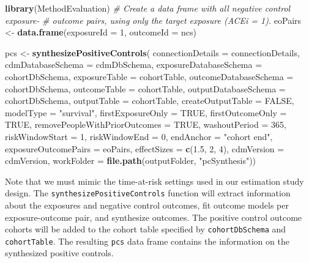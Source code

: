 \documentclass[11pt]{book}
\newenvironment{Shaded}{\begin{snugshade}}{\end{snugshade}}
\newcommand{\KeywordTok}[1]{\textcolor[rgb]{0.13,0.29,0.53}{\textbf{#1}}}
\newcommand{\DataTypeTok}[1]{\textcolor[rgb]{0.13,0.29,0.53}{#1}}
\newcommand{\DecValTok}[1]{\textcolor[rgb]{0.00,0.00,0.81}{#1}}
\newcommand{\FloatTok}[1]{\textcolor[rgb]{0.00,0.00,0.81}{#1}}
\newcommand{\StringTok}[1]{\textcolor[rgb]{0.31,0.60,0.02}{#1}}
\newcommand{\CommentTok}[1]{\textcolor[rgb]{0.56,0.35,0.01}{\textit{#1}}}
\newcommand{\OtherTok}[1]{\textcolor[rgb]{0.56,0.35,0.01}{#1}}
\newcommand{\NormalTok}[1]{#1}
\theoremstyle{definition}
\theoremstyle{definition}
\theoremstyle{definition}
\theoremstyle{remark}
\begin{document}
\begin{Shaded}
\begin{Highlighting}[]
\KeywordTok{library}\NormalTok{(MethodEvaluation)}
\CommentTok{# Create a data frame with all negative control exposure-}
\CommentTok{# outcome pairs, using only the target exposure (ACEi = 1).}
\NormalTok{eoPairs <-}\StringTok{ }\KeywordTok{data.frame}\NormalTok{(}\DataTypeTok{exposureId =} \DecValTok{1}\NormalTok{,}
                      \DataTypeTok{outcomeId =}\NormalTok{ ncs)}

\NormalTok{pcs <-}\StringTok{ }\KeywordTok{synthesizePositiveControls}\NormalTok{(}
  \DataTypeTok{connectionDetails =}\NormalTok{ connectionDetails,}
  \DataTypeTok{cdmDatabaseSchema =}\NormalTok{ cdmDbSchema,}
  \DataTypeTok{exposureDatabaseSchema =}\NormalTok{ cohortDbSchema,}
  \DataTypeTok{exposureTable =}\NormalTok{ cohortTable,}
  \DataTypeTok{outcomeDatabaseSchema =}\NormalTok{ cohortDbSchema,}
  \DataTypeTok{outcomeTable =}\NormalTok{ cohortTable,}
  \DataTypeTok{outputDatabaseSchema =}\NormalTok{ cohortDbSchema,}
  \DataTypeTok{outputTable =}\NormalTok{ cohortTable,}
  \DataTypeTok{createOutputTable =} \OtherTok{FALSE}\NormalTok{,}
  \DataTypeTok{modelType =} \StringTok{"survival"}\NormalTok{,}
  \DataTypeTok{firstExposureOnly =} \OtherTok{TRUE}\NormalTok{,}
  \DataTypeTok{firstOutcomeOnly =} \OtherTok{TRUE}\NormalTok{,}
  \DataTypeTok{removePeopleWithPriorOutcomes =} \OtherTok{TRUE}\NormalTok{,}
  \DataTypeTok{washoutPeriod =} \DecValTok{365}\NormalTok{,}
  \DataTypeTok{riskWindowStart =} \DecValTok{1}\NormalTok{,}
  \DataTypeTok{riskWindowEnd =} \DecValTok{0}\NormalTok{,}
  \DataTypeTok{endAnchor =} \StringTok{"cohort end"}\NormalTok{,}
  \DataTypeTok{exposureOutcomePairs =}\NormalTok{ eoPairs,}
  \DataTypeTok{effectSizes =} \KeywordTok{c}\NormalTok{(}\FloatTok{1.5}\NormalTok{, }\DecValTok{2}\NormalTok{, }\DecValTok{4}\NormalTok{),}
  \DataTypeTok{cdmVersion =}\NormalTok{ cdmVersion,}
  \DataTypeTok{workFolder =} \KeywordTok{file.path}\NormalTok{(outputFolder, }\StringTok{"pcSynthesis"}\NormalTok{))}
\end{Highlighting}
\end{Shaded}

Note that we must mimic the time-at-risk settings used in our estimation
study design. The \texttt{synthesizePositiveControls} function will
extract information about the exposures and negative control outcomes,
fit outcome models per exposure-outcome pair, and synthesize outcomes.
The positive control outcome cohorts will be added to the cohort table
specified by \texttt{cohortDbSchema} and \texttt{cohortTable}. The
resulting \texttt{pcs} data frame contains the information on the
synthesized positive controls.
\end{document}
